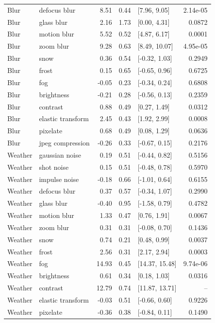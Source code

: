 \begin{longtable}{llrrlr}
Blur & defocus blur & 8.51 & 0.44 & [7.96, 9.05] & 2.14e-05\\
Blur & glass blur & 2.16 & 1.73 & [0.00, 4.31] & 0.0872\\
Blur & motion blur & 5.52 & 0.52 & [4.87, 6.17] & 0.0001\\
Blur & zoom blur & 9.28 & 0.63 & [8.49, 10.07] & 4.95e-05\\
Blur & snow & 0.36 & 0.54 & [-0.32, 1.03] & 0.2949\\
Blur & frost & 0.15 & 0.65 & [-0.65, 0.96] & 0.6725\\
Blur & fog & -0.05 & 0.23 & [-0.34, 0.24] & 0.6808\\
Blur & brightness & -0.21 & 0.28 & [-0.56, 0.13] & 0.2359\\
Blur & contrast & 0.88 & 0.49 & [0.27, 1.49] & 0.0312\\
Blur & elastic transform & 2.45 & 0.43 & [1.92, 2.99] & 0.0008\\
Blur & pixelate & 0.68 & 0.49 & [0.08, 1.29] & 0.0636\\
Blur & jpeg compression & -0.26 & 0.33 & [-0.67, 0.15] & 0.2176\\
Weather & gaussian noise & 0.19 & 0.51 & [-0.44, 0.82] & 0.5156\\
Weather & shot noise & 0.15 & 0.51 & [-0.48, 0.78] & 0.5970\\
Weather & impulse noise & -0.18 & 0.66 & [-1.01, 0.64] & 0.6155\\
Weather & defocus blur & 0.37 & 0.57 & [-0.34, 1.07] & 0.2990\\
Weather & glass blur & -0.40 & 0.95 & [-1.58, 0.79] & 0.4782\\
Weather & motion blur & 1.33 & 0.47 & [0.76, 1.91] & 0.0067\\
Weather & zoom blur & 0.31 & 0.31 & [-0.08, 0.70] & 0.1436\\
Weather & snow & 0.74 & 0.21 & [0.48, 0.99] & 0.0037\\
Weather & frost & 2.56 & 0.31 & [2.17, 2.94] & 0.0003\\
Weather & fog & 14.93 & 0.45 & [14.37, 15.48] & 9.74e-06\\
Weather & brightness & 0.61 & 0.34 & [0.18, 1.03] & 0.0316\\
Weather & contrast & 12.79 & 0.74 & [11.87, 13.71] & --\\
Weather & elastic transform & -0.03 & 0.51 & [-0.66, 0.60] & 0.9226\\
Weather & pixelate & -0.36 & 0.38 & [-0.84, 0.11] & 0.1490\\

\end{longtable}
